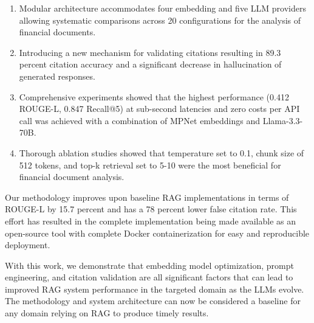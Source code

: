 \documentclass[runningheads]{llncs}
\begin{document}
\begin{enumerate}
    \item Modular architecture accommodates four embedding and five LLM providers allowing systematic comparisons across 20 configurations for the analysis of financial documents.
    
    \item Introducing a new mechanism for validating citations resulting in 89.3 percent citation accuracy and a significant decrease in hallucination of generated responses.
    
    \item Comprehensive experiments showed that the highest performance (0.412 ROUGE-L, 0.847 Recall@5) at sub-second latencies and zero costs per API call was achieved with a combination of MPNet embeddings and Llama-3.3-70B.
    
    \item Thorough ablation studies showed that temperature set to 0.1, chunk size of 512 tokens, and top-k retrieval set to 5-10 were the most beneficial for financial document analysis.
\end{enumerate}

Our methodology improves upon baseline RAG implementations in terms of ROUGE-L by 15.7 percent and has a 78 percent lower false citation rate. This effort has resulted in the complete implementation being made available as an open-source tool with complete Docker containerization for easy and reproducible deployment. 

With this work, we demonstrate that embedding model optimization, prompt engineering, and citation validation are all significant factors that can lead to improved RAG system performance in the targeted domain as the LLMs evolve. The methodology and system architecture can now be considered a baseline for any domain relying on RAG to produce timely results.
\end{document}
